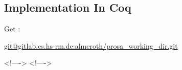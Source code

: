 \subsection{Implementation In Coq}

Get : 

\url{git@gitlab.cs.hs-rm.de:almeroth/prosa_working_dir.git}



\newcommand{\includecode}[2][c]{<!---->}

\includecode{sched.c}
\includecode[asm]{sched.c}

